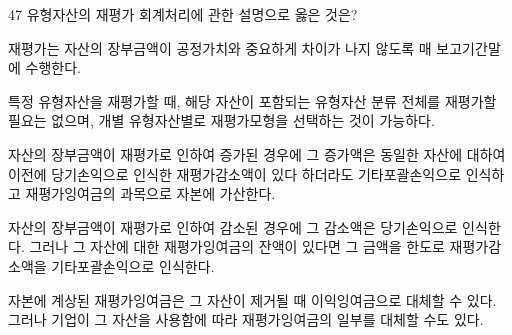 \begin{question}{47}
유형자산의 재평가 회계처리에 관한 설명으로 옳은 것은?
\begin{choices}
  \item 재평가는 자산의 장부금액이 공정가치와 중요하게 차이가 나지 않도록 매 보고기간말에 수행한다.
  \item 특정 유형자산을 재평가할 때, 해당 자산이 포함되는 유형자산 분류 전체를 재평가할 필요는 없으며, 개별 유형자산별로 재평가모형을 선택하는 것이 가능하다.
  \item 자산의 장부금액이 재평가로 인하여 증가된 경우에 그 증가액은 동일한 자산에 대하여 이전에 당기손익으로 인식한 재평가감소액이 있다 하더라도 기타포괄손익으로 인식하고 재평가잉여금의 과목으로 자본에 가산한다.
  \item 자산의 장부금액이 재평가로 인하여 감소된 경우에 그 감소액은 당기손익으로 인식한다. 그러나 그 자산에 대한 재평가잉여금의 잔액이 있다면 그 금액을 한도로 재평가감소액을 기타포괄손익으로 인식한다.
  \item 자본에 계상된 재평가잉여금은 그 자산이 제거될 때 이익잉여금으로 대체할 수 있다. 그러나 기업이 그 자산을 사용함에 따라 재평가잉여금의 일부를 대체할 수도 있다.
\end{choices}
\end{question}
